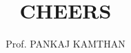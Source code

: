 \documentclass[a4paper]{report}
\title{CHEERS}
\author{Prof. PANKAJ KAMTHAN}
\begin{document}


\tableofcontents
\newpage






\renewcommand{\bibname}{References}

\end{document}
